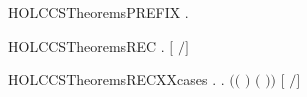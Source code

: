 \newcommand{\HOLCCSTheoremsPARXXcasesXXEQ}{\UseVerbatim{HOLCCSTheoremsPARXXcasesXXEQ}}
\begin{SaveVerbatim}{HOLCCSTheoremsPREFIX}
\HOLTokenTurnstile{} \HOLSymConst{\HOLTokenForall{}} . \HOLSymConst{\ensuremath{\ldotp}} \HOLTokenTransBegin{}\HOLTokenTransEnd {}
\end{SaveVerbatim}
\newcommand{\HOLCCSTheoremsPREFIX}{\UseVerbatim{HOLCCSTheoremsPREFIX}}
\begin{SaveVerbatim}{HOLCCSTheoremsREC}
\HOLTokenTurnstile{} \HOLSymConst{\HOLTokenForall{}}   . \ensuremath{[}  \ensuremath{/}\ensuremath{]}  \HOLTokenTransBegin{}\HOLTokenTransEnd {} \HOLSymConst{\HOLTokenImp{}}    \HOLTokenTransBegin{}\HOLTokenTransEnd {}
\end{SaveVerbatim}
\newcommand{\HOLCCSTheoremsREC}{\UseVerbatim{HOLCCSTheoremsREC}}
\begin{SaveVerbatim}{HOLCCSTheoremsRECXXcases}
\HOLTokenTurnstile{} \HOLSymConst{\HOLTokenForall{}}   .
          \HOLTokenTransBegin{}\HOLTokenTransEnd {} \HOLSymConst{\HOLTokenImp{}}
       \HOLSymConst{\HOLTokenExists{}} .
           \ensuremath{(}\ensuremath{(} \HOLSymConst{\ensuremath{=}} \ensuremath{)} \HOLSymConst{\HOLTokenConj{}} \ensuremath{(} \HOLSymConst{\ensuremath{=}} \ensuremath{)}\ensuremath{)} \HOLSymConst{\HOLTokenConj{}} \ensuremath{[}  \ensuremath{/}\ensuremath{]}  \HOLTokenTransBegin{}\HOLTokenTransEnd {}
\end{SaveVerbatim}
\newcommand{\HOLCCSTheoremsRECXXcases}{\UseVerbatim{HOLCCSTheoremsRECXXcases}}
